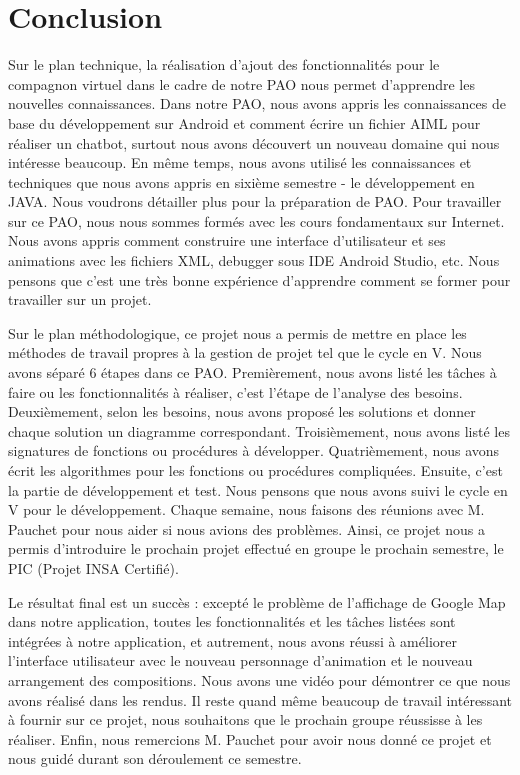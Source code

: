 \section*{Conclusion}

\indent Sur le plan technique, la réalisation d'ajout des fonctionnalités pour le compagnon virtuel dans le cadre de notre PAO nous permet d'apprendre les nouvelles connaissances. Dans notre PAO, nous avons appris les connaissances de base du développement sur Android et comment écrire un fichier AIML pour réaliser un chatbot, surtout nous avons découvert un nouveau domaine qui nous intéresse beaucoup. En même temps, nous avons utilisé les connaissances et techniques que nous avons appris en sixième semestre - le développement en JAVA. Nous voudrons détailler plus pour la préparation de PAO. Pour travailler sur ce PAO, nous nous sommes formés avec les cours fondamentaux sur Internet. Nous avons appris comment construire une interface d'utilisateur et ses animations avec les fichiers XML, debugger sous IDE Android Studio, etc. Nous pensons que c'est une très bonne expérience d'apprendre comment se former pour travailler sur un projet.

\indent Sur le plan méthodologique, ce projet nous a permis de mettre en place les méthodes de travail propres à la gestion de projet tel que le cycle en V. Nous avons séparé 6 étapes dans ce PAO. Premièrement, nous avons listé les tâches à faire ou les fonctionnalités à réaliser, c'est l'étape de l'analyse des besoins. Deuxièmement, selon les besoins, nous avons proposé les solutions et donner chaque solution un diagramme correspondant. Troisièmement, nous avons listé les signatures de fonctions ou procédures à développer. Quatrièmement, nous avons écrit les algorithmes pour les fonctions ou procédures compliquées. Ensuite, c'est la partie de développement et test. Nous pensons que nous avons suivi le cycle en V pour le développement. Chaque semaine, nous faisons des réunions avec M. Pauchet pour nous aider si nous avions des problèmes. Ainsi, ce projet nous a permis d'introduire le prochain projet effectué en groupe le prochain semestre, le PIC (Projet INSA Certifié).

\indent Le résultat final est un succès : excepté le problème de l'affichage de Google Map dans notre application, toutes les fonctionnalités et les tâches listées sont intégrées à notre application, et autrement, nous avons réussi à améliorer l'interface utilisateur avec le nouveau personnage d'animation et le nouveau arrangement des compositions. Nous avons une vidéo pour démontrer ce que nous avons réalisé dans les rendus. Il reste quand même beaucoup de travail intéressant à fournir sur ce projet, nous souhaitons que le prochain groupe réussisse à les réaliser. Enfin, nous remercions M. Pauchet pour avoir nous donné ce projet et nous guidé durant son déroulement ce semestre.

\newpage
